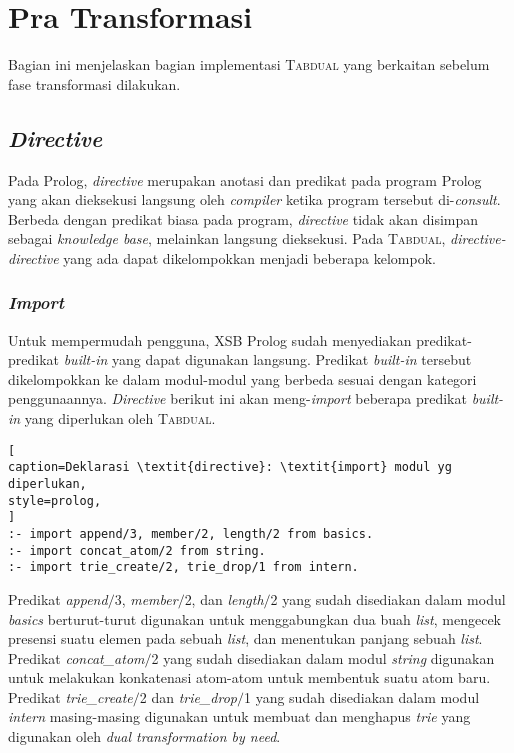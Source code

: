\section{Pra Transformasi}

Bagian ini menjelaskan bagian implementasi \textsc{Tabdual} yang berkaitan sebelum fase transformasi dilakukan.

\subsection{\textit{Directive}}

Pada Prolog, \textit{directive} merupakan anotasi dan predikat pada program Prolog yang akan dieksekusi langsung oleh \textit{compiler} ketika program tersebut di-\textit{consult}. Berbeda dengan predikat biasa pada program, \textit{directive} tidak akan disimpan sebagai \textit{knowledge base}, melainkan langsung dieksekusi. Pada \textsc{Tabdual}, \textit{directive-directive} yang ada dapat dikelompokkan menjadi beberapa kelompok.

\subsubsection{\textit{Import}}

Untuk mempermudah pengguna, XSB Prolog sudah menyediakan predikat-predikat \textit{built-in} yang dapat digunakan langsung. Predikat \textit{built-in} tersebut dikelompokkan ke dalam modul-modul yang berbeda sesuai dengan kategori penggunaannya. \textit{Directive} berikut ini akan meng-\textit{import} beberapa predikat \textit{built-in} yang diperlukan oleh \textsc{Tabdual}.
\\

\begin{lstlisting}[
caption=Deklarasi \textit{directive}: \textit{import} modul yg diperlukan,
style=prolog,
]
:- import append/3, member/2, length/2 from basics.
:- import concat_atom/2 from string.
:- import trie_create/2, trie_drop/1 from intern.
\end{lstlisting}

Predikat \textit{append$/$}3, \textit{member$/$}2, dan \textit{length$/$}2 yang sudah disediakan dalam modul \textit{basics} berturut-turut digunakan untuk menggabungkan dua buah \textit{list}, mengecek presensi suatu elemen pada sebuah \textit{list}, dan menentukan panjang sebuah \textit{list}. Predikat \textit{concat\_atom$/$}2 yang sudah disediakan dalam modul \textit{string} digunakan untuk melakukan konkatenasi atom-atom untuk membentuk suatu atom baru. Predikat \textit{trie\_create$/$}2 dan \textit{trie\_drop$/$}1 yang sudah disediakan dalam modul \textit{intern} masing-masing digunakan untuk membuat dan menghapus \textit{trie} yang digunakan oleh \textit{dual transformation by need}.

